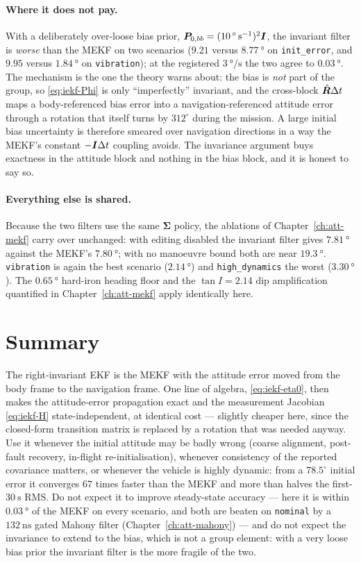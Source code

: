\paragraph{Where it does not pay.} With a deliberately over-loose bias prior,
$\bm{P}_{0,bb}=(\SI{10}{\degree\per\second})^2\bm{I}$, the invariant filter is \emph{worse} than the
MEKF on two scenarios ($9.21$ versus $\SI{8.77}{\degree}$ on \texttt{init\_error}, and $9.95$ versus
$\SI{1.84}{\degree}$ on \texttt{vibration}); at the registered $\SI{3}{\degree\per\second}$ the two
agree to $\SI{0.03}{\degree}$. The mechanism is the one the theory warns about: the bias is
\emph{not} part of the group, so \eqref{eq:iekf-Phi} is only ``imperfectly'' invariant, and the
cross-block $\hat{\bm{R}}\Delta t$ maps a body-referenced bias error into a navigation-referenced
attitude error through a rotation that itself turns by $312^\circ$ during the mission. A large
initial bias uncertainty is therefore smeared over navigation directions in a way the MEKF's
constant $-\bm{I}\Delta t$ coupling avoids. The invariance argument buys exactness in the attitude block
and nothing in the bias block, and it is honest to say so.

\paragraph{Everything else is shared.} Because the two filters use the same $\bm{\Sigma}$ policy,
the ablations of Chapter~\ref{ch:att-mekf} carry over unchanged: with editing disabled the invariant
filter gives $\SI{7.81}{\degree}$ against the MEKF's $\SI{7.80}{\degree}$; with no manoeuvre bound
both are near $\SI{19.3}{\degree}$. \texttt{vibration} is again the best scenario
($\SI{2.14}{\degree}$) and \texttt{high\_dynamics} the worst ($\SI{3.30}{\degree}$). The
$\SI{0.65}{\degree}$ hard-iron heading floor and the $\tan I=2.14$ dip amplification quantified in
Chapter~\ref{ch:att-mekf} apply identically here.

\section{Summary}
The right-invariant EKF is the MEKF with the attitude error moved from the body frame to the
navigation frame. One line of algebra, \eqref{eq:iekf-eta0}, then makes the attitude-error
propagation exact and the measurement Jacobian \eqref{eq:iekf-H} state-independent, at identical
cost --- slightly cheaper here, since the closed-form transition matrix is replaced by a rotation
that was needed anyway. Use it whenever the initial attitude may be badly wrong (coarse alignment,
post-fault recovery, in-flight re-initialisation), whenever consistency of the reported covariance
matters, or whenever the vehicle is highly dynamic: from a $78.5^\circ$ initial error it converges
$67$ times faster than the MEKF and more than halves the first-$\SI{30}{\second}$ RMS. Do not expect it to
improve steady-state accuracy --- here it is within $\SI{0.03}{\degree}$ of the MEKF on every
scenario, and both are beaten on \texttt{nominal} by a $\SI{132}{\nano\second}$ gated Mahony filter
(Chapter~\ref{ch:att-mahony}) --- and do not expect the invariance to extend to the bias, which is
not a group element: with a very loose bias prior the invariant filter is the more fragile of the
two.
